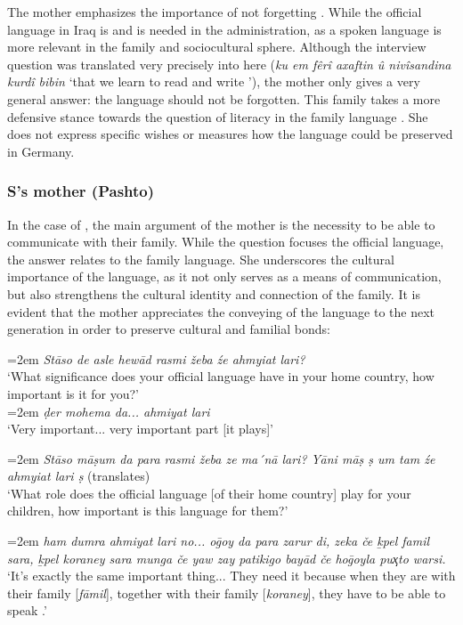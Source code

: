 \documentclass[output=paper,colorlinks,citecolor=brown]{langscibook}
\newenvironment{interview}{
  \setlength{\leftskip}{2.5em} %
  \setlength{\rightskip}{2.5em} %
  \setlength{\parindent}{0pt} %
  \vspace{\topsep} %
}{
  \vspace{\topsep} %
}
\newcommand{\speaker}[1]{%
  \noindent\hangindent=2em\makebox[1.5em][l]{#1:}\hspace{0.5em}%
}
\newcommand{\myattrib}[1]{%
    \attrib{#1}
}
\begin{document}
The mother emphasizes the importance of not forgetting . While the official language in Iraq is  and is needed in the administration,  as a spoken language is more relevant in the family and sociocultural sphere. Although the interview question was translated very precisely into  here (\textit{ku em fêrî axaftin û nivîsandina kurdî bibin} `that we learn to read and write '), the mother only gives a very general answer: the language should not be forgotten. This family takes a more defensive stance towards the question of literacy in the family language . She does not express specific wishes or measures how the language could be preserved in Germany. 

\subsubsection{S's mother (Pashto)}\label{ch2.5.ss.4.3.4}

In the case of , the main argument of the mother is the necessity to be able to communicate with their family. While the question focuses the official language, the answer relates to the family language. She underscores the cultural importance of the language, as it not only serves as a means of communication, but also strengthens the cultural identity and connection of the family. It is evident that the mother appreciates the conveying of the language to the next generation in order to preserve cultural and familial bonds:

\begin{interview}\label{ch2.5.ex.34}
\speaker{I}\textit{Stāso de asle hewād rasmi žeba źe ahmyiat lari?} \\
`What significance does your official language have in your home country, how important is it for you?' \\
\speaker{MS}\textit{ḍer mohema da... ahmiyat lari} \\
`Very important... very important part [it plays]' 

\speaker{I}\textit{Stāso māṣum da para rasmi žeba ze ma´nā lari? Yāni māṣ ṣ um tam źe ahmyiat lari ṣ} (translates)\\
`What role does the official language [of their home country] play for your children, how important is this language for them?' 

\speaker{MS}\textit{ham dumra ahmiyat lari no... oḡoy da para zarur di, zeka če ḵpel famil sara,  ḵpel koraney sara munga če yaw zay patikigo bayād če hoḡoyla puҳto warsi.} \\
`It's exactly the same important thing... They need it because when they are with their family [\textit{fāmil}], together with their family [\textit{koraney}], they have to be able to speak .' 
\myattrib{Int 1\_S\_mother, 110--121}
\end{interview}
\end{document}
